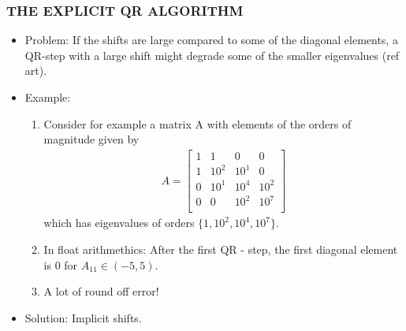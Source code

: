 \documentclass[a4paper,8pt]{beamer} %
\newcommand{\smatrix}[1]{\left[\begin{matrix} #1 \end{matrix}\right]}
\begin{document}
\begin{frame}%
	\frametitle{THE EXPLICIT QR ALGORITHM}
\begin{itemize}
	\item <1-> Problem: If the shifts are large compared to some of the diagonal elements, 
				a QR-step with a large shift might degrade some of the smaller eigenvalues (ref art).
	\item <2-> Example:
		\begin{enumerate}
			\item <2->
				Consider for example a matrix A with elements of the orders of
				magnitude given by
				\begin{align}
					A= \smatrix{
						1&1&0&0\\
						1&10^{2}&10^{1}&0\\
						0&10^{1}&10^{4}&10^{2}\\
						0&0&10^{2}&10^{7}\\
					}
				\end{align}
				which has eigenvalues of orders $\{1,10^2,10^4,10^{7}\}$. 
			\item <3-> In float arithmethics: After the first QR - step, 
				the first diagonal element is 0 for $A_{11}\in(-5,5)$.
			\item <4-> A lot of round off error!
		\end{enumerate}
	\item <5-> Solution: Implicit shifts.
\end{itemize}
\end{frame}%
\end{document}
